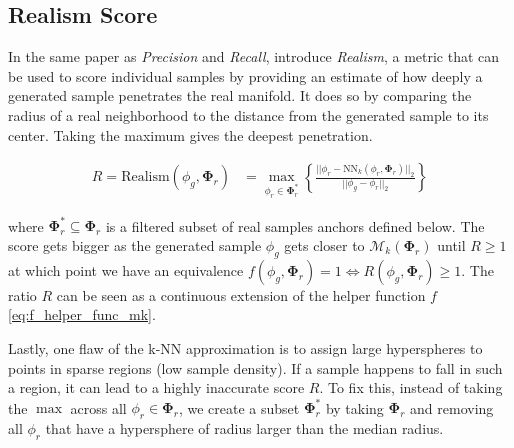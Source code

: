 \subsection{Realism Score}
\label{subsec:realism}


In the same paper as \emph{Precision} and \emph{Recall}, \cite{kynkaanniemi_improved_2019} introduce \emph{Realism}, a metric that can be used to score individual samples by providing an estimate of how deeply a generated sample penetrates the real manifold. 
It does so by comparing the radius of a real neighborhood to the distance from the generated sample to its center. 
Taking the maximum gives the deepest penetration. 

\begin{align}
    R = \mathrm{Realism}(\phi_g, \boldsymbol\Phi_r) &=
    \max_{\phi_r \in \boldsymbol\Phi_r^*}
    \left\{ \frac{||\phi_r - \mathrm{NN}_k(\phi_r, \boldsymbol{\Phi}_r)||_2}{||\phi_g-\phi_r||_2}\right\}
\end{align}

where $\boldsymbol\Phi_r^* \subseteq \boldsymbol\Phi_r$ is a filtered subset of real samples anchors defined below. 
The score gets bigger as the generated sample $\phi_g$ gets closer to $\mathcal{M}_k(\boldsymbol\Phi_r)$ until $R \ge 1$ at which point we have an equivalence $f(\phi_g, \boldsymbol{\Phi}_r) = 1 \iff R(\phi_g, \boldsymbol{\Phi}_r) \ge 1$. 
The ratio $R$ can be seen as a continuous extension of the helper function $f$ \eqref{eq:f_helper_func_mk}.

Lastly, one flaw of the k-NN approximation is to assign large hyperspheres to points in sparse regions (low sample density). 
If a sample happens to fall in such a region, it can lead to a highly inaccurate score $R$. To fix this, instead of taking the $\max$ across all $\phi_r \in \boldsymbol{\Phi}_r$, we create a subset $\boldsymbol{\Phi}_r^*$ by taking $\boldsymbol{\Phi}_r$ and removing all $\phi_r$ that have a hypersphere of radius larger than the median radius.

